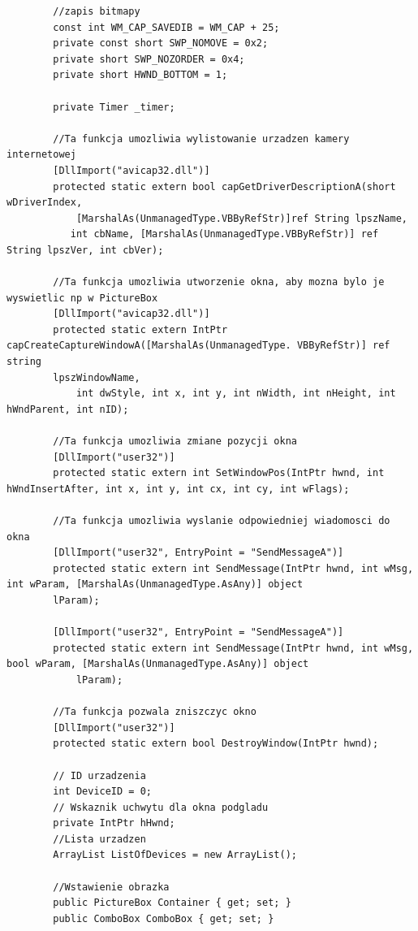 \documentclass[12pt,a4paper,notitlepage]{report}
\begin{document}
\begin{adjustwidth}{0pt}{-50pt}
\begin{lstlisting}
        //zapis bitmapy
        const int WM_CAP_SAVEDIB = WM_CAP + 25;
        private const short SWP_NOMOVE = 0x2;
        private short SWP_NOZORDER = 0x4;
        private short HWND_BOTTOM = 1;

        private Timer _timer;

        //Ta funkcja umozliwia wylistowanie urzadzen kamery internetowej
        [DllImport("avicap32.dll")]
        protected static extern bool capGetDriverDescriptionA(short wDriverIndex,
            [MarshalAs(UnmanagedType.VBByRefStr)]ref String lpszName,
           int cbName, [MarshalAs(UnmanagedType.VBByRefStr)] ref String lpszVer, int cbVer);

        //Ta funkcja umozliwia utworzenie okna, aby mozna bylo je wyswietlic np w PictureBox
        [DllImport("avicap32.dll")]
        protected static extern IntPtr capCreateCaptureWindowA([MarshalAs(UnmanagedType. VBByRefStr)] ref string
    	lpszWindowName,
            int dwStyle, int x, int y, int nWidth, int nHeight, int hWndParent, int nID);

        //Ta funkcja umozliwia zmiane pozycji okna
        [DllImport("user32")]
        protected static extern int SetWindowPos(IntPtr hwnd, int hWndInsertAfter, int x, int y, int cx, int cy, int wFlags);

        //Ta funkcja umozliwia wyslanie odpowiedniej wiadomosci do okna
        [DllImport("user32", EntryPoint = "SendMessageA")]
        protected static extern int SendMessage(IntPtr hwnd, int wMsg, int wParam, [MarshalAs(UnmanagedType.AsAny)] object
    	lParam);

        [DllImport("user32", EntryPoint = "SendMessageA")]
        protected static extern int SendMessage(IntPtr hwnd, int wMsg, bool wParam, [MarshalAs(UnmanagedType.AsAny)] object
            lParam);

        //Ta funkcja pozwala zniszczyc okno
        [DllImport("user32")]
        protected static extern bool DestroyWindow(IntPtr hwnd);

        // ID urzadzenia
        int DeviceID = 0;
        // Wskaznik uchwytu dla okna podgladu
        private IntPtr hHwnd;
        //Lista urzadzen
        ArrayList ListOfDevices = new ArrayList();

        //Wstawienie obrazka
        public PictureBox Container { get; set; }
        public ComboBox ComboBox { get; set; }


\end{lstlisting}
\end{adjustwidth}
\end{document}
